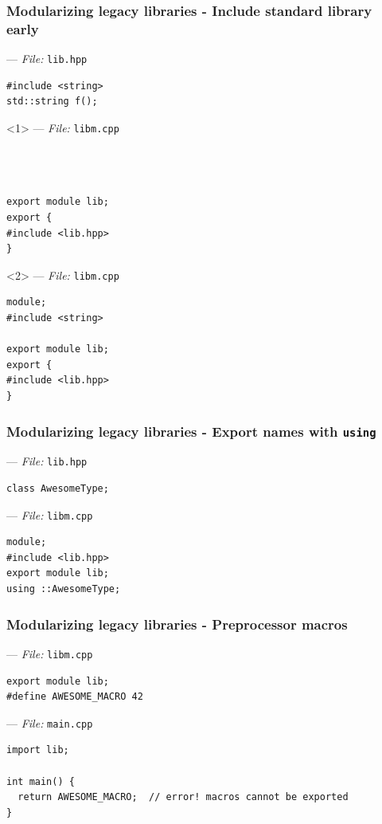 \documentclass[aspectratio=169]{beamer}
\begin{document}
\begin{frame}[fragile]
  \frametitle{Modularizing legacy libraries - Include standard library early}
  --- \textit{File:} \texttt{lib.hpp}
  \begin{lstlisting}[style=cpp20]
#include <string>
std::string f();
  \end{lstlisting}

  \begin{onlyenv}<1>
  --- \textit{File:} \texttt{libm.cpp}
  \begin{lstlisting}[style=cpp20]



export module lib;
export {
#include <lib.hpp>
}
  \end{lstlisting}
  \end{onlyenv}

  \begin{onlyenv}<2>
  --- \textit{File:} \texttt{libm.cpp}
  \begin{lstlisting}[style=cpp20]
module;
#include <string>

export module lib;
export {
#include <lib.hpp>
}
  \end{lstlisting}
  \end{onlyenv}
\end{frame}

\begin{frame}[fragile]
  \frametitle{Modularizing legacy libraries - Export names with \texttt{using}}

  --- \textit{File:} \texttt{lib.hpp}
  \begin{lstlisting}[style=cpp20]
class AwesomeType;
  \end{lstlisting}
  --- \textit{File:} \texttt{libm.cpp}
  \begin{lstlisting}[style=cpp20]
module;
#include <lib.hpp>
export module lib;
using ::AwesomeType;
  \end{lstlisting}
\end{frame}

\begin{frame}[fragile]
  \frametitle{Modularizing legacy libraries - Preprocessor macros}
  
  --- \textit{File:} \texttt{libm.cpp}
  \begin{lstlisting}[style=cpp20]
export module lib;
#define AWESOME_MACRO 42
  \end{lstlisting}
  
  --- \textit{File:} \texttt{main.cpp}
  \begin{lstlisting}[style=cpp20]
import lib;

int main() {
  return AWESOME_MACRO;  // error! macros cannot be exported
}
  \end{lstlisting}
\end{frame}
\end{document}
